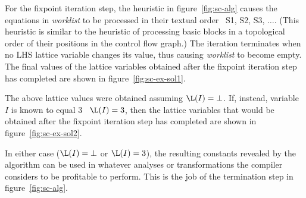 For the fixpoint iteration step, the heuristic in
figure~\ref{fig:sc-alg} causes the equations in {\it worklist} to be
processed in their textual order \ie\ S1, S2, S3, $\ldots$.  
(This heuristic
is similar to the heuristic of processing basic blocks in 
a topological order of their positions in the control flow graph.)
The
iteration terminates when no LHS lattice variable changes its value,
thus causing {\it worklist} to become empty.  The final values of
the lattice variables obtained
after the fixpoint iteration step has completed are shown in
figure~\ref{fig:sc-ex-sol1}.


The above lattice values were obtained assuming $\L(I) = \bot$.  If, instead,
variable $I$ is known to equal 3 \ie\ $\L(I) = 3$, then 
the lattice variables that would be obtained
after the fixpoint iteration step has completed are shown in
figure~\ref{fig:sc-ex-sol2}.

In either case ($\L(I) = \bot$ or $\L(I) = 3$), the resulting constants
revealed by the algorithm can be used in whatever analyses or
transformations the compiler considers to 
be profitable to perform.  This is the job
of the termination
step in figure~\ref{fig:sc-alg}.

